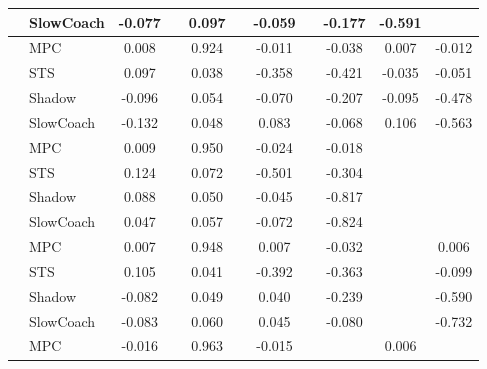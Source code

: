 \begin{tabular}{|l|l|*{9}{c|}}
                                                           & SlowCoach &   -0.077 &        &     0.097 &     & -0.059 &     &  -0.177 &  -0.591 &       \\
\midrule
[True, False, True, False, True, False, True, True, True] & MPC &    0.008 &        &     0.924 &     & -0.011 &     &  -0.038 &   0.007 &   -0.012 \\
                                                           & STS &    0.097 &        &     0.038 &     & -0.358 &     &  -0.421 &  -0.035 &   -0.051 \\
                                                           & Shadow &   -0.096 &        &     0.054 &     & -0.070 &     &  -0.207 &  -0.095 &   -0.478 \\
                                                           & SlowCoach &   -0.132 &        &     0.048 &     &  0.083 &     &  -0.068 &   0.106 &   -0.563 \\
\midrule
[True, False, True, False, True, False, True, False, False] & MPC &    0.009 &        &     0.950 &     & -0.024 &     &  -0.018 &      &       \\
                                                           & STS &    0.124 &        &     0.072 &     & -0.501 &     &  -0.304 &      &       \\
                                                           & Shadow &    0.088 &        &     0.050 &     & -0.045 &     &  -0.817 &      &       \\
                                                           & SlowCoach &    0.047 &        &     0.057 &     & -0.072 &     &  -0.824 &      &       \\
\midrule
[True, False, True, False, True, False, True, False, True] & MPC &    0.007 &        &     0.948 &     &  0.007 &     &  -0.032 &      &    0.006 \\
                                                           & STS &    0.105 &        &     0.041 &     & -0.392 &     &  -0.363 &      &   -0.099 \\
                                                           & Shadow &   -0.082 &        &     0.049 &     &  0.040 &     &  -0.239 &      &   -0.590 \\
                                                           & SlowCoach &   -0.083 &        &     0.060 &     &  0.045 &     &  -0.080 &      &   -0.732 \\
\midrule
[True, False, True, False, True, False, False, True, False] & MPC &   -0.016 &        &     0.963 &     & -0.015 &     &      &   0.006 &       \\

\end{tabular}
